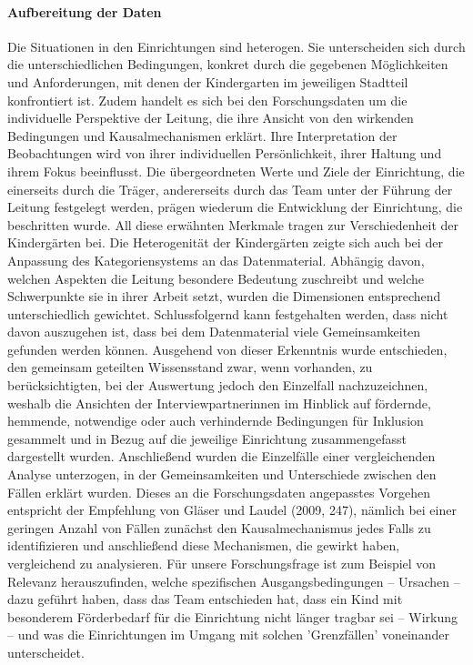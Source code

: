 \paragraph{Aufbereitung der Daten}
Die Situationen in den Einrichtungen sind heterogen. Sie unterscheiden sich durch die unterschiedlichen Bedingungen, konkret durch die gegebenen Möglichkeiten und Anforderungen, mit denen der Kindergarten im jeweiligen Stadtteil konfrontiert ist. Zudem handelt es sich bei den Forschungsdaten um die individuelle Perspektive der Leitung, die ihre Ansicht von den wirkenden Bedingungen und Kausalmechanismen erklärt. Ihre Interpretation der Beobachtungen wird von ihrer individuellen Persönlichkeit, ihrer Haltung und ihrem Fokus beeinflusst. Die übergeordneten Werte und Ziele der Einrichtung, die einerseits durch die Träger, andererseits durch das Team unter der Führung der Leitung festgelegt werden, prägen wiederum die Entwicklung der Einrichtung, die beschritten wurde. All diese erwähnten Merkmale tragen zur Verschiedenheit der Kindergärten bei.   
Die Heterogenität der Kindergärten zeigte sich auch bei der Anpassung des Kategoriensystems an das Datenmaterial. Abhängig davon, welchen Aspekten die Leitung besondere Bedeutung zuschreibt und welche Schwerpunkte sie in ihrer Arbeit setzt, wurden die Dimensionen entsprechend unterschiedlich gewichtet. 
Schlussfolgernd kann festgehalten werden, dass nicht davon auszugehen ist, dass bei dem Daten\-material viele Gemeinsamkeiten gefunden
werden können. Ausgehend von dieser Erkenntnis wurde entschieden, den gemeinsam geteilten Wissensstand zwar, wenn vorhanden, zu berücksichtigten, bei der Auswertung jedoch den Einzelfall nachzuzeichnen, weshalb die Ansichten der Interviewpartnerinnen im Hinblick auf fördernde, hemmende, notwendige oder auch verhindernde Bedingungen für Inklusion gesammelt und in Bezug auf die jeweilige Einrichtung zusammengefasst dargestellt wurden. Anschließend wurden die Einzelfälle einer vergleichenden Analyse unterzogen, in der
Gemeinsamkeiten und Unterschiede zwischen den Fällen erklärt wurden.
Dieses an die Forschungsdaten angepasstes Vorgehen entspricht der Empfehlung von Gläser und Laudel (2009, 247), nämlich bei einer geringen Anzahl von Fällen zunächst den Kausalmechanismus jedes Falls zu identifizieren und anschließend diese Mechanismen, die gewirkt haben, vergleichend zu analysieren.  
Für unsere Forschungsfrage ist zum Beispiel von Relevanz herauszufinden, welche spezifischen Ausgangsbedingungen – Ursachen – dazu geführt haben, dass das Team entschieden hat, dass ein Kind mit besonderem Förderbedarf für die Einrichtung nicht länger tragbar sei – Wirkung – und was die Einrichtungen im Umgang mit solchen ’Grenzfällen’ voneinander unterscheidet.

